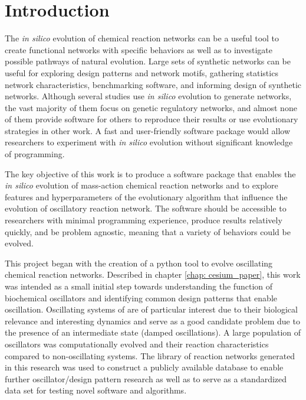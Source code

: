 \documentclass[12pt]{report}
\begin{document}
\chapter{Introduction}
The \textit{in silico} evolution of chemical reaction networks can be a useful tool to create functional networks with specific behaviors as well as to investigate possible pathways of natural evolution. Large sets of synthetic networks can be useful for exploring design patterns and network motifs, gathering statistics network characteristics, benchmarking software, and informing design of synthetic networks. Although several studies use \textit{in silico} evolution to generate networks, the vast majority of them focus on genetic regulatory networks, and almost none of them provide software for others to reproduce their results or use evolutionary strategies in other work. A fast and user-friendly software package would allow researchers to experiment with \textit{in silico} evolution without significant knowledge of programming. 

The key objective of this work is to produce a software package that enables the \textit{in silico} evolution of mass-action chemical reaction networks and to explore features and hyperparameters of the evolutionary algorithm that influence the evolution of oscillatory reaction network. The software should be accessible to researchers with minimal programming experience, produce results relatively quickly, and be problem agnostic, meaning that a variety of behaviors could be evolved.  

This project began with the creation of a python tool to evolve oscillating chemical reaction networks. Described in chapter \ref{chap: cesium_paper}, this work was intended as a small initial step towards understanding the function of biochemical oscillators and identifying common design patterns that enable oscillation. Oscillating systems of are of particular interest due to their biological relevance and interesting dynamics and serve as a good candidate problem due to the presence of an intermediate state (damped oscillations). A large population of oscillators was computationally evolved and their reaction characteristics compared to non-oscillating systems. The library of reaction networks generated in this research was used to construct a publicly available database to enable further oscillator/design pattern research as well as to serve as a standardized data set for testing novel software and algorithms. 
\end{document}
